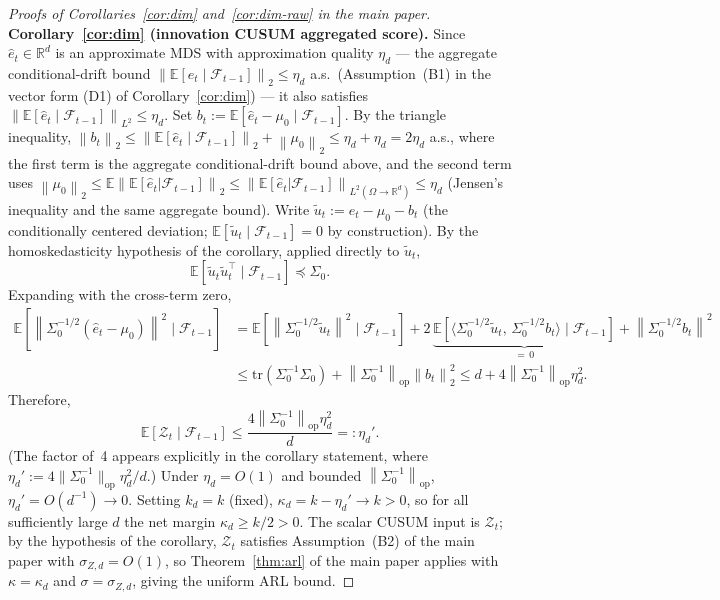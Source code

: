 \documentclass[bj,authoryear]{imsart}
\theoremstyle{plain}
\theoremstyle{definition}
\newcommand{\E}{\mathbb{E}}
\newcommand{\R}{\mathbb{R}}
\newcommand{\F}{\mathcal{F}}
\newcommand{\norm}[1]{\left\lVert #1 \right\rVert}
\newcommand{\given}{\mid}
\begin{document}
\begin{proof}[Proofs of Corollaries~\ref{cor:dim} and~\ref{cor:dim-raw} in the main paper]
  \textbf{Corollary~\ref{cor:dim} (innovation CUSUM aggregated score).}
  Since $\hat{e}_t \in \R^d$ is an approximate MDS with approximation
  quality $\eta_d$ --- the aggregate conditional-drift bound
  $\norm{\E[\hat{e}_t\given\F_{t-1}]}_2 \leq \eta_d$ a.s.\
  (Assumption~(B1) in the vector form (D1) of
  Corollary~\ref{cor:dim}) --- it also satisfies
  $\norm{\E[\hat{e}_t\given\F_{t-1}]}_{L^2} \leq \eta_d$.
  Set $b_t := \E[\hat{e}_t - \mu_0\given\F_{t-1}]$.  By the triangle inequality,
  $\norm{b_t}_2 \leq \norm{\E[\hat{e}_t\given\F_{t-1}]}_2 + \norm{\mu_0}_2
    \leq \eta_d + \eta_d = 2\eta_d$ a.s.,
  where the first term is the aggregate conditional-drift bound above,
  and the second term uses $\norm{\mu_0}_2 \leq \E\norm{\E[\hat{e}_t|\F_{t-1}]}_2
  \leq \norm{\E[\hat{e}_t|\F_{t-1}]}_{L^2(\Omega\to\R^d)} \leq \eta_d$
  (Jensen's inequality and the same aggregate bound).
  Write $\tilde{u}_t := \hat{e}_t - \mu_0 - b_t$ (the conditionally centered
  deviation; $\E[\tilde{u}_t\given\F_{t-1}] = 0$ by construction). By the
  homoskedasticity hypothesis of the corollary, applied directly to
  $\tilde u_t$,
  \[
    \E[\tilde{u}_t\tilde{u}_t^\top\given\F_{t-1}]
    \preceq \Sigma_0.
  \]
  Expanding with the cross-term zero,
  \begin{align*}
    \E\!\left[\norm{\Sigma_0^{-1/2}(\hat{e}_t-\mu_0)}^2\given\F_{t-1}\right]
    &= \E\!\left[\norm{\Sigma_0^{-1/2}\tilde{u}_t}^2\given\F_{t-1}\right]
       + 2\,\underbrace{\E\!\left[\langle\Sigma_0^{-1/2}\tilde{u}_t,\,\Sigma_0^{-1/2}b_t\rangle\given\F_{t-1}\right]}_{=\,0}
       + \norm{\Sigma_0^{-1/2}b_t}^2 \\
    &\leq \mathrm{tr}(\Sigma_0^{-1}\Sigma_0) + \norm{\Sigma_0^{-1}}_{\mathrm{op}}\norm{b_t}_2^2
     \leq d + 4\norm{\Sigma_0^{-1}}_{\mathrm{op}}\eta_d^2.
  \end{align*}
  Therefore,
  \[
    \E[\mathcal{Z}_t\given\F_{t-1}]
    \leq \frac{4\norm{\Sigma_0^{-1}}_{\mathrm{op}}\eta_d^2}{d} =: \eta_d'.
  \]
  (The factor of~4 appears explicitly in the corollary statement, where $\eta_d':=4\|\Sigma_0^{-1}\|_{\mathrm{op}}\eta_d^2/d$.)
  Under $\eta_d = O(1)$ and bounded $\norm{\Sigma_0^{-1}}_{\mathrm{op}}$,
  $\eta_d' = O(d^{-1}) \to 0$.
  Setting $k_d = k$ (fixed), $\kappa_d = k - \eta_d' \to k > 0$,
  so for all sufficiently large $d$ the net margin $\kappa_d \geq k/2 > 0$.
  The scalar CUSUM input is $\mathcal{Z}_t$; by the hypothesis of the corollary,
  $\mathcal{Z}_t$ satisfies Assumption~(B2) of the main paper with
  $\sigma_{Z,d} = O(1)$, so Theorem~\ref{thm:arl} of the main paper applies
  with $\kappa = \kappa_d$ and $\sigma = \sigma_{Z,d}$, giving the uniform ARL bound.


\end{proof}
\end{document}
